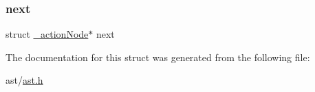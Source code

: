 \mbox{\label{struct__action_node_a99f2a1b315217397adbc19ed2501d4d0}} 
\subsubsection{\texorpdfstring{next}{next}}
{\footnotesize\ttfamily struct \hyperlink{struct__action_node}{\+\_\+action\+Node}$\ast$ next}



The documentation for this struct was generated from the following file\+:\begin{DoxyCompactItemize}
\item 
ast/\hyperlink{ast_8h}{ast.\+h}\end{DoxyCompactItemize}

